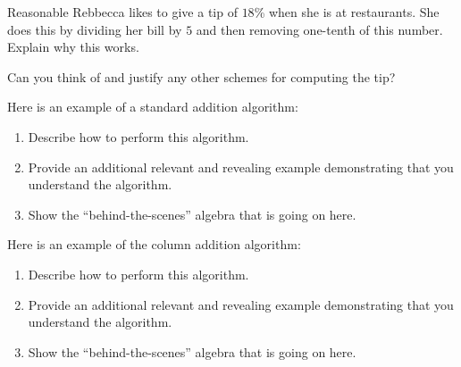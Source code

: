 \documentclass[nooutcomes]{ximera}
\begin{document}
\begin{problem}Reasonable Rebbecca likes to give a tip of $18$\% when she is at
  restaurants. She does this by dividing her bill by $5$ and then
  removing one-tenth of this number. Explain why this works.
\end{problem} 

\begin{problem}Can you think of and justify any other schemes for computing the
  tip?
\end{problem} 

\begin{problem}Here is an example of a standard addition algorithm:
\begin{image}
\end{image}
\begin{enumerate}
\item Describe how to perform this algorithm.
\item Provide an additional relevant and revealing example
  demonstrating that you understand the algorithm.
\item Show the ``behind-the-scenes'' algebra that is going on here.
\end{enumerate}
\end{problem} 

\begin{problem}Here is an example of the column addition
  algorithm:
\begin{image}
\end{image}
\begin{enumerate}
\item Describe how to perform this algorithm.
\item Provide an additional relevant and revealing example
  demonstrating that you understand the algorithm.
\item Show the ``behind-the-scenes'' algebra that is going on here.
\end{enumerate}
\end{problem} 
\end{document}
